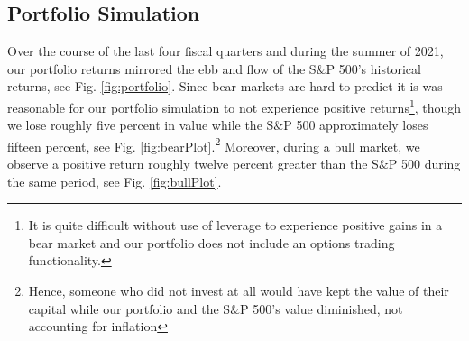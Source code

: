 \documentclass{article}
\begin{document}
\subsection{Portfolio Simulation}
Over the course of the last four fiscal quarters and during the summer of 2021, our portfolio returns mirrored the ebb and flow of the S$\&$P 500's historical returns, see Fig. \ref{fig:portfolio}. Since bear markets are hard to predict it is was reasonable for our portfolio simulation to not experience positive returns\footnote{It is quite difficult without use of leverage to experience positive gains in a bear market and our portfolio does not include an options trading functionality.}, though we lose roughly five percent in value while the S$\&$P 500 approximately loses fifteen percent, see Fig. \ref{fig:bearPlot}.\footnote{Hence, someone who did not invest at all would have kept the value of their capital while our portfolio and the S$\&$P 500's value diminished, not accounting for inflation} Moreover, during a bull market, we observe a positive return roughly twelve percent greater than the S$\&$P 500 during the same period, see Fig. \ref{fig:bullPlot}.
\end{document}
